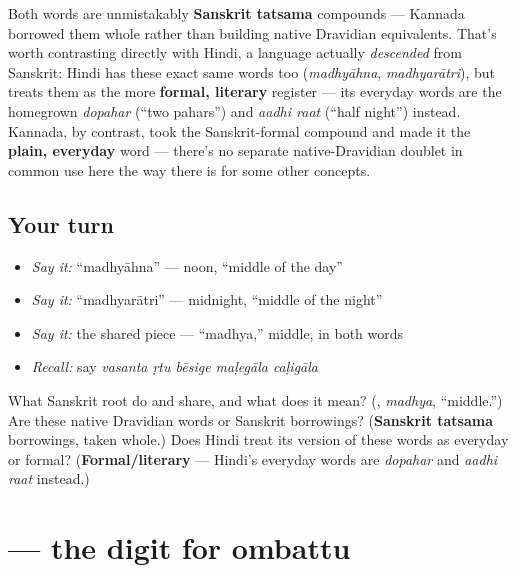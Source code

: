 \begin{culture}
Both words are unmistakably \textbf{Sanskrit tatsama} compounds — Kannada borrowed them whole rather than building native Dravidian equivalents. That's worth contrasting directly with Hindi, a language actually \emph{descended} from Sanskrit: Hindi has these exact same words too (\emph{madhyāhna}, \emph{madhyarātri}), but treats them as the more \textbf{formal, literary} register — its everyday words are the homegrown \emph{dopahar} (\textquotedblleft{}two pahars\textquotedblright{}) and \emph{aadhi raat} (\textquotedblleft{}half night\textquotedblright{}) instead. Kannada, by contrast, took the Sanskrit-formal compound and made it the \textbf{plain, everyday} word — there's no separate native-Dravidian doublet in common use here the way there is for some other concepts.
\end{culture}

\subsection*{Your turn}
\begin{itemize}
\raggedright
  \item \emph{Say it:} \textquotedblleft{}madhyāhna\textquotedblright{} — noon, \textquotedblleft{}middle of the day\textquotedblright{}
  \item \emph{Say it:} \textquotedblleft{}madhyarātri\textquotedblright{} — midnight, \textquotedblleft{}middle of the night\textquotedblright{}
  \item \emph{Say it:} the shared piece — \textquotedblleft{}madhya,\textquotedblright{} middle, in both words
  \item \emph{Recall:} say \emph{vasanta ṛtu bēsige maḷegāla caḷigāla}
\end{itemize}

\begin{tcolorbox}[breakable,colback=teal!4,colframe=teal!35!black,title={Before you move on}]
What Sanskrit root do \textbf{} and \textbf{} share, and what does it mean? (\textbf{}, \emph{madhya}, \textquotedblleft{}middle.\textquotedblright{}) Are these native Dravidian words or Sanskrit borrowings? (\textbf{Sanskrit tatsama} borrowings, taken whole.) Does Hindi treat its version of these words as everyday or formal? (\textbf{Formal/literary} — Hindi's everyday words are \emph{dopahar} and \emph{aadhi raat} instead.)
\end{tcolorbox}
\section[\texorpdfstring{\kn{೯} (9)}{೯ (9)}]{ — the digit for ombattu}

